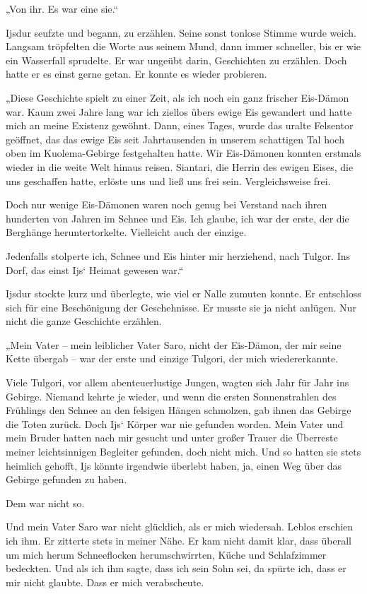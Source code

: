 „Von ihr. Es war eine sie.“

Ijsdur seufzte und begann, zu erzählen. Seine sonst tonlose Stimme wurde weich. Langsam tröpfelten die Worte aus seinem Mund, dann immer schneller, bis er wie ein Wasserfall sprudelte. Er war ungeübt darin, Geschichten zu erzählen. Doch hatte er es einst gerne getan. Er konnte es wieder probieren.

„Diese Geschichte spielt zu einer Zeit, als ich noch ein ganz frischer Eis-Dämon war. Kaum zwei Jahre lang war ich ziellos übers ewige Eis gewandert und hatte mich an meine Existenz gewöhnt. Dann, eines Tages, wurde das uralte Felsentor geöffnet, das das ewige Eis seit Jahrtausenden in unserem schattigen Tal hoch oben im Kuolema-Gebirge festgehalten hatte. Wir Eis-Dämonen konnten erstmals wieder in die weite Welt hinaus reisen. Siantari, die Herrin des ewigen Eises, die uns geschaffen hatte, erlöste uns und ließ uns frei sein. Vergleichsweise frei.

Doch nur wenige Eis-Dämonen waren noch genug bei Verstand nach ihren hunderten von Jahren im Schnee und Eis. Ich glaube, ich war der erste, der die Berghänge heruntertorkelte. Vielleicht auch der einzige.

Jedenfalls stolperte ich, Schnee und Eis hinter mir herziehend, nach Tulgor. Ins Dorf, das einst Ijs‘ Heimat gewesen war.“

Ijsdur stockte kurz und überlegte, wie viel er Nalle zumuten konnte. Er entschloss sich für eine Beschönigung der Geschehnisse. Er musste sie ja nicht anlügen. Nur nicht die ganze Geschichte erzählen.

„Mein Vater – mein leiblicher Vater Saro, nicht der Eis-Dämon, der mir seine Kette übergab – war der erste und einzige Tulgori, der mich wiedererkannte.

Viele Tulgori, vor allem abenteuerlustige Jungen, wagten sich Jahr für Jahr ins Gebirge. Niemand kehrte je wieder, und wenn die ersten Sonnenstrahlen des Frühlings den Schnee an den felsigen Hängen schmolzen, gab ihnen das Gebirge die Toten zurück. Doch Ijs‘ Körper war nie gefunden worden. Mein Vater und mein Bruder hatten nach mir gesucht und unter großer Trauer die Überreste meiner leichtsinnigen Begleiter gefunden, doch nicht mich. Und so hatten sie stets heimlich gehofft, Ijs könnte irgendwie überlebt haben, ja, einen Weg über das Gebirge gefunden zu haben.

Dem war nicht so.

Und mein Vater Saro war nicht glücklich, als er mich wiedersah. Leblos erschien ich ihm. Er zitterte stets in meiner Nähe. Er kam nicht damit klar, dass überall um mich herum Schneeflocken herumschwirrten, Küche und Schlafzimmer bedeckten. Und als ich ihm sagte, dass ich sein Sohn sei, da spürte ich, dass er mir nicht glaubte. Dass er mich verabscheute.

